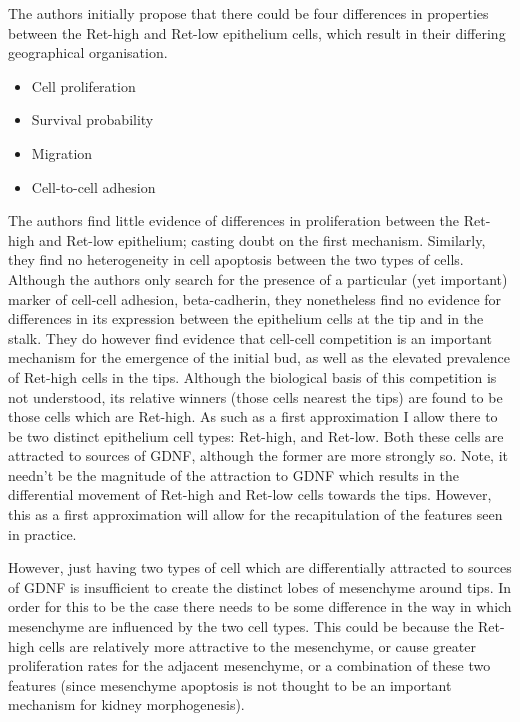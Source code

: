\documentclass[pdftex,10pt,a4paper]{article}
\begin{document}
The authors initially propose that there could be four differences in properties between the Ret-high and Ret-low epithelium cells, which result in their differing geographical organisation. 

\begin{itemize}
\item Cell proliferation
\item Survival probability
\item Migration
\item Cell-to-cell adhesion
\end{itemize}

The authors find little evidence of differences in proliferation between the Ret-high and Ret-low epithelium; casting doubt on the first mechanism. Similarly, they find no heterogeneity in cell apoptosis between the two types of cells. Although the authors only search for the presence of a particular (yet important) marker of cell-cell adhesion, beta-cadherin, they nonetheless find no evidence for differences in its expression between the epithelium cells at the tip and in the stalk. They do however find evidence that cell-cell competition is an important mechanism for the emergence of the initial bud, as well as the elevated prevalence of Ret-high cells in the tips. Although the biological basis of this competition is not understood, its relative winners (those cells nearest the tips) are found to be those cells which are Ret-high. As such as a first approximation I allow there to be two distinct epithelium cell types: Ret-high, and Ret-low. Both these cells are attracted to sources of GDNF, although the former are more strongly so. Note, it needn't be the magnitude of the attraction to GDNF which results in the differential movement of Ret-high and Ret-low cells towards the tips. However, this as a first approximation will allow for the recapitulation of the features seen in practice. 

However, just having two types of cell which are differentially attracted to sources of GDNF is insufficient to create the distinct lobes of mesenchyme around tips. In order for this to be the case there needs to be some difference in the way in which mesenchyme are influenced by the two cell types. This could be because the Ret-high cells are relatively more attractive to the mesenchyme, or cause greater proliferation rates for the adjacent mesenchyme, or a combination of these two features (since mesenchyme apoptosis is not thought to be an important mechanism for kidney morphogenesis).
\end{document}
